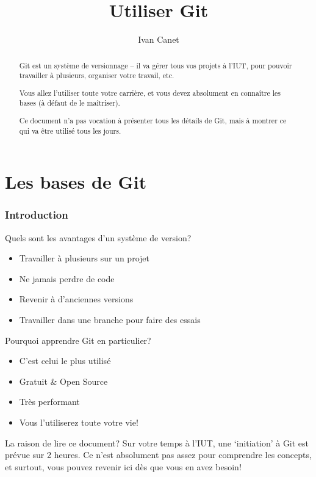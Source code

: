 \documentclass[10pt,a4paper]{article}
\begin{document}
\title{Utiliser Git}
\author{Ivan Canet}
\maketitle
\begin{abstract}
Git est un système de versionnage -- il va gérer tous vos projets à l'IUT, pour pouvoir travailler à plusieurs, organiser votre travail, etc.

Vous allez l'utiliser toute votre carrière, et vous devez absolument en connaître les bases (à défaut de le maîtriser).

Ce document n'a pas vocation à présenter tous les détails de Git, mais à montrer ce qui va être utilisé tous les jours.
\end{abstract}

\tableofcontents

\part{Les bases de Git}

\section{Introduction}

Quels sont les avantages d'un système de version?

\begin{itemize}
\item Travailler à plusieurs sur un projet
\item Ne jamais perdre de code
\item Revenir à d'anciennes versions
\item Travailler dans une branche pour faire des essais
\end{itemize}

Pourquoi apprendre Git en particulier?

\begin{itemize}
\item C'est celui le plus utilisé
\item Gratuit \& Open Source
\item Très performant
\item Vous l'utiliserez toute votre vie!
\end{itemize}

La raison de lire ce document? Sur votre temps à l'IUT, une `initiation' à Git est prévue sur 2 heures. Ce n'est absolument pas assez pour comprendre les concepts, et surtout, vous pouvez revenir ici dès que vous en avez besoin!
\end{document}
